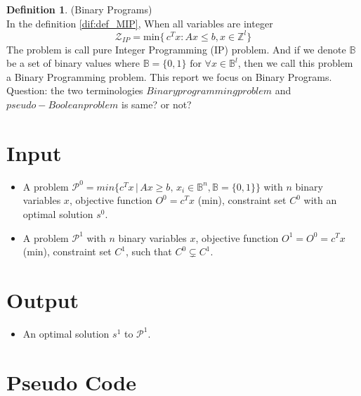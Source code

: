 \documentclass[11pt]{article}
\theoremstyle{definition}
\newtheorem{definition}{Definition}[section] %
\begin{document}
\begin{definition}
(Binary Programs)\\
In the definition \ref{dif:def_MIP}, When all variables are integer
$$\mathcal{Z}_{IP} = \text{min} \lbrace\, c^Tx : Ax \leq b, x \in \mathbb{Z}^l \rbrace $$ 
The problem is call pure Integer Programming (IP) problem. And if we denote $\mathbb{B}$ be a set of binary values where $\mathbb{B} = \{0, 1 \} \text{ for } \forall x \in \mathbb{B}^l$, then we call this problem a Binary Programming problem.  This report we focus on Binary Programs.\\
Question: the two terminologies $Binary programming problem$ and $pseudo-Boolean problem$ is same? or not?
\label{dif:def_bp}
\end{definition}


\section{Input}
\begin{itemize}
    \item A problem $ \mathcal{P}^0 = min \{ c^Tx\,|\, Ax \geq b,\, x_i \in \mathbb{B}^n, \mathbb{B} = \lbrace 0,1\rbrace  \}$ with $n$ binary variables $x$, objective function $ O^0 = c^T x$ (min), constraint set $C^0$ with an optimal solution $s^0$.
    \item A problem $\mathcal{P}^1$ with $n$ binary variables $x$, objective function $O^1 = O^0 = c^Tx$ (min), constraint set $C^1$, such that $C^0 \subsetneq C^1$.
\end{itemize}							

\section{Output}
\begin{itemize}	
    \item An optimal solution $s^1$ to $\mathcal{P}^1$.
\end{itemize}

\section{Pseudo Code}
\end{document}
